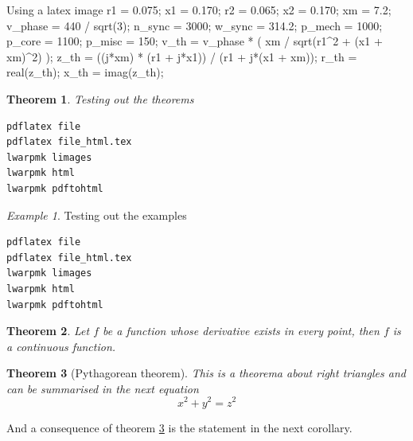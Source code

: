 \documentclass{report}
\theoremstyle{plain}
\newtheorem{theorem}{Theorem}[section]
\theoremstyle{definition}
\theoremstyle{remark}
\newtheorem{example}{Example}[section]
\begin{document}
\begin{lateximage}
\begin{matlaboutput}{Using a latex image}
	r1 = 0.075; %
	x1 = 0.170; %
	r2 = 0.065; %
	x2 = 0.170; %
	xm = 7.2; %
	v_phase = 440 / sqrt(3); %
	n_sync = 3000; %
	w_sync = 314.2; %
	p_mech = 1000; %
	p_core = 1100; %
	p_misc = 150; %
	v_th = v_phase * ( xm / sqrt(r1^2 + (x1 + xm)^2) );
	z_th = ((j*xm) * (r1 + j*x1)) / (r1 + j*(x1 + xm));
	r_th = real(z_th);
	x_th = imag(z_th);
\end{matlaboutput}
\end{lateximage}

\begin{theorem}
	Testing out the theorems
\end{theorem}
\begin{verbatim}
pdflatex file
pdflatex file_html.tex
lwarpmk limages
lwarpmk html
lwarpmk pdftohtml
\end{verbatim}

\begin{example}
Testing out the examples
\begin{verbatim}
pdflatex file
pdflatex file_html.tex
lwarpmk limages
lwarpmk html
lwarpmk pdftohtml
\end{verbatim}
\end{example}

\begin{theorem}
	Let $f$ be a function whose derivative exists in every point, then $f$ is 
	a continuous function.
\end{theorem}

\begin{theorem}[Pythagorean theorem]
	\label{pythagorean}
	This is a theorema about right triangles and can be summarised in the next 
	equation 
	\[ x^2 + y^2 = z^2 \]
\end{theorem}

And a consequence of theorem \ref{pythagorean} is the statement in the next 
corollary.
\end{document}
